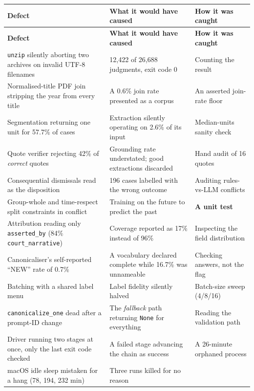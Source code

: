 \documentclass[12pt,a4paper]{article}
\newcommand{\code}[1]{\texttt{\small #1}}
\begin{document}
{\small
\begin{longtable}{@{}p{4.3cm}p{5.3cm}p{4.6cm}@{}}
\toprule
\textbf{Defect} & \textbf{What it would have caused} & \textbf{How it was caught} \\
\midrule
\endfirsthead
\toprule
\textbf{Defect} & \textbf{What it would have caused} & \textbf{How it was caught} \\
\midrule
\endhead
\code{unzip} silently aborting two archives on invalid UTF-8 filenames
 & 12,422 of 26,688 judgments, exit code 0
 & Counting the result \\
\addlinespace
Normalised-title PDF join stripping the year from every title
 & A 0.6\% join rate presented as a corpus
 & An asserted join-rate floor \\
\addlinespace
Segmentation returning one unit for 57.7\% of cases
 & Extraction silently operating on 2.6\% of its input
 & Median-units sanity check \\
\addlinespace
Quote verifier rejecting 42\% of \emph{correct} quotes
 & Grounding rate understated; good extractions discarded
 & Hand audit of 16 quotes \\
\addlinespace
Consequential dismissals read as the disposition
 & 196 cases labelled with the wrong outcome
 & Auditing rules-vs-LLM conflicts \\
\addlinespace
Group-whole and time-respect split constraints in conflict
 & Training on the future to predict the past
 & \textbf{A unit test} \\
\addlinespace
Attribution reading only \code{asserted\_by} (84\% \code{court\_narrative})
 & Coverage reported as 17\% instead of 96\%
 & Inspecting the field distribution \\
\addlinespace
Canonicaliser's self-reported ``NEW'' rate of 0.7\%
 & A vocabulary declared complete while 16.7\% was unnameable
 & Checking answers, not the flag \\
\addlinespace
Batching with a shared label menu
 & Label fidelity silently halved
 & Batch-size sweep (4/8/16) \\
\addlinespace
\code{canonicalize\_one} dead after a prompt-ID change
 & The \emph{fallback} path returning \code{None} for everything
 & Reading the validation path \\
\addlinespace
Driver running two stages at once, only the last exit code checked
 & A failed stage advancing the chain as success
 & A 26-minute orphaned process \\
\addlinespace
macOS idle sleep mistaken for a hang (78, 194, 232 min)
 & Three runs killed for no reason

\end{longtable}}
\end{document}

